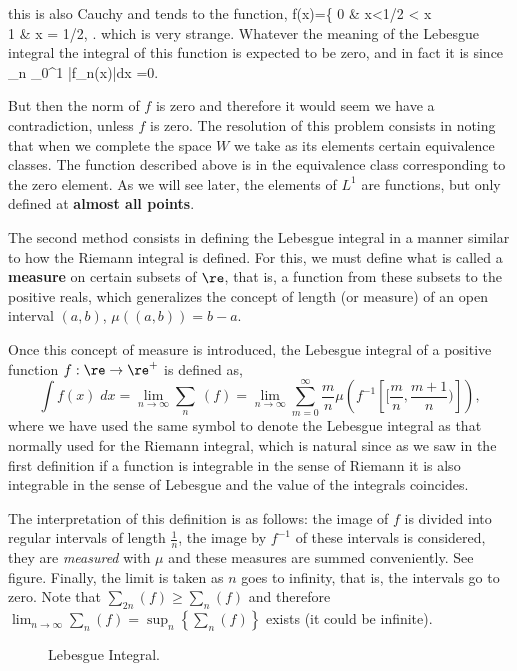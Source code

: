 this is also Cauchy and tends to the function,
\beq
f(x)=\left\{
0 & \;\;\;\;\leq x<1/2 < x  \\
1 & \;\;\;\;\;x = 1/2,
\earr\right.
\eeq
which is very strange. Whatever the meaning of the Lebesgue integral the integral of this function is expected to be zero, and in fact it is since
\beq
\lim_{n\to\infty} \int_0^1 |f_n(x)|\;dx =0.
\eeq

But then the norm of $f$ is zero and therefore it would seem we have a contradiction, unless $f$ is zero. The resolution of this problem consists in noting that when we complete the space $W$ we take as its elements certain equivalence classes. The function described above is in the equivalence class corresponding to the zero element. As we will see later, the elements of $L^1$ are functions, but only defined at {\bf almost all points}.

The second method consists in defining the Lebesgue integral in a manner similar to how the Riemann integral is defined. For this, we must define what is called a {\bf measure} on certain subsets of $\re$, that is, a function from these subsets to the positive reals, which generalizes the concept of length (or measure) of an open interval $(a,b)$, $\mu ((a,b)) = b-a$.

Once this concept of measure is introduced, the Lebesgue integral of a positive function $f:\re \to \re^+$ is defined as,
\[
\int f(x)\;dx =\lim_{n\to\infty}\sum_n\:(f)
=\lim_{n\to\infty}\sum_{m=0}^{\infty} \frac mn \mu \left(f^{-1} \left[
[\frac mn, \frac {m+1}n)\right]\right),
\]
where we have used the same symbol to denote the Lebesgue integral as that normally used for the Riemann integral, which is natural since as we saw in the first definition if a function is integrable in the sense of Riemann it is also integrable in the sense of Lebesgue and the value of the integrals coincides.

The interpretation of this definition is as follows: the image of $f$ is divided into regular intervals of length $\frac 1n$, the image by $f^{-1}$ of these intervals is considered, they are {\it measured} with $\mu$ and these measures are summed conveniently. See figure. Finally, the limit is taken as $n$ goes to infinity, that is, the intervals go to zero. Note that $\sum_{2n} (f) \geq\sum_n (f)$ and therefore $\lim_{n\to\infty}\sum_n(f)=\sup_n \left\{\sum_n (f)\right\}$ exists (it could be infinite).

\espa
\begin{figure}[htbp]
\begin{center}
\caption{Lebesgue Integral.}
\label{fig:8_3}
\end{center}
\end{figure}

